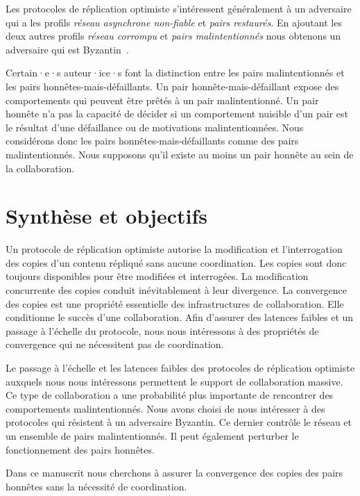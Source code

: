 Les protocoles de réplication optimiste s'intéressent généralement à un adversaire qui a les profils \emph{réseau asynchrone non-fiable} et \emph{pairs restaurés}.
En ajoutant les deux autres profils \emph{réseau corrompu} et \emph{pairs malintentionnés} nous obtenons un adversaire qui est Byzantin~\autocite{lamport_1982_byzantinegeneralsproblem}.

\clearpage

Certain·e·s auteur·ice·s font la distinction entre les pairs malintentionnés et les pairs honnêtes-mais-défaillants.
Un pair honnête-mais-défaillant expose des comportements qui peuvent être prêtés à un pair malintentionné.
Un pair honnête n'a pas la capacité de décider si un comportement nuisible d'un pair est le résultat d'une défaillance ou de motivations malintentionnées.
Nous considérons donc les pairs honnêtes-mais-défaillants comme des pairs malintentionnés.
Nous supposons qu'il existe au moins un pair honnête au sein de la collaboration.


\section{Synthèse et objectifs}

Un protocole de réplication optimiste autorise la modification et l'interrogation des copies d'un contenu répliqué sans aucune coordination.
Les copies sont donc toujours disponibles pour être modifiées et interrogées.
La modification concurrente des copies conduit inévitablement à leur divergence.
La convergence des copies est une propriété essentielle des infrastructures de collaboration.
Elle conditionne le succès d'une collaboration.
Afin d'assurer des latences faibles et un passage à l'échelle du protocole, nous nous intéressons à des propriétés de convergence qui ne nécessitent pas de coordination.

Le passage à l'échelle et les latences faibles des protocoles de réplication optimiste auxquels nous nous intéressons permettent le support de collaboration massive.
Ce type de collaboration a une probabilité plus importante de rencontrer des comportements malintentionnés.
Nous avons choisi de nous intéresser à des protocoles qui résistent à un adversaire Byzantin.
Ce dernier contrôle le réseau et un ensemble de pairs malintentionnés.
Il peut également perturber le fonctionnement des pairs honnêtes.

Dans ce manuscrit nous cherchons à assurer la convergence des copies des pairs honnêtes sans la nécessité de coordination.
